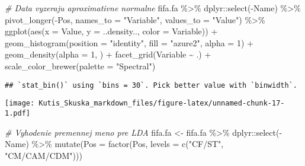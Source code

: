 \documentclass[
]{article}
\newenvironment{Shaded}{\begin{snugshade}}{\end{snugshade}}
\newcommand{\AttributeTok}[1]{\textcolor[rgb]{0.77,0.63,0.00}{#1}}
\newcommand{\CommentTok}[1]{\textcolor[rgb]{0.56,0.35,0.01}{\textit{#1}}}
\newcommand{\DecValTok}[1]{\textcolor[rgb]{0.00,0.00,0.81}{#1}}
\newcommand{\FunctionTok}[1]{\textcolor[rgb]{0.00,0.00,0.00}{#1}}
\newcommand{\NormalTok}[1]{#1}
\newcommand{\OtherTok}[1]{\textcolor[rgb]{0.56,0.35,0.01}{#1}}
\newcommand{\SpecialCharTok}[1]{\textcolor[rgb]{0.00,0.00,0.00}{#1}}
\newcommand{\StringTok}[1]{\textcolor[rgb]{0.31,0.60,0.02}{#1}}
\begin{document}
\begin{Shaded}
\begin{Highlighting}[]
\CommentTok{\# Data vyzeraju aproximativne normalne}
\NormalTok{fifa.fa }\SpecialCharTok{\%\textgreater{}\%}
\NormalTok{    dplyr}\SpecialCharTok{::}\FunctionTok{select}\NormalTok{(}\SpecialCharTok{{-}}\NormalTok{Name) }\SpecialCharTok{\%\textgreater{}\%}
    \FunctionTok{pivot\_longer}\NormalTok{(}\SpecialCharTok{{-}}\NormalTok{Pos, }\AttributeTok{names\_to =} \StringTok{"Variable"}\NormalTok{, }\AttributeTok{values\_to =} \StringTok{"Value"}\NormalTok{) }\SpecialCharTok{\%\textgreater{}\%}
    \FunctionTok{ggplot}\NormalTok{(}\FunctionTok{aes}\NormalTok{(}\AttributeTok{x =}\NormalTok{ Value, }\AttributeTok{y =}\NormalTok{ ..density.., }\AttributeTok{color =}\NormalTok{ Variable)) }\SpecialCharTok{+}
    \FunctionTok{geom\_histogram}\NormalTok{(}\AttributeTok{position =} \StringTok{"identity"}\NormalTok{,}
                   \AttributeTok{fill =} \StringTok{"azure2"}\NormalTok{,}
                   \AttributeTok{alpha =} \DecValTok{1}\NormalTok{) }\SpecialCharTok{+}
    \FunctionTok{geom\_density}\NormalTok{(}\AttributeTok{alpha =} \DecValTok{1}\NormalTok{, ) }\SpecialCharTok{+}
    \FunctionTok{facet\_grid}\NormalTok{(Variable }\SpecialCharTok{\textasciitilde{}}\NormalTok{ .) }\SpecialCharTok{+}
    \FunctionTok{scale\_color\_brewer}\NormalTok{(}\AttributeTok{palette =} \StringTok{"Spectral"}\NormalTok{)}
\end{Highlighting}
\end{Shaded}

\begin{verbatim}
## `stat_bin()` using `bins = 30`. Pick better value with `binwidth`.
\end{verbatim}

\texttt{[image: Kutis\_Skuska\_markdown\_files/figure-latex/unnamed-chunk-17-1.pdf]}

\begin{Shaded}
\begin{Highlighting}[]
\CommentTok{\# Vyhodenie premennej meno pre LDA}
\NormalTok{fifa.fa }\OtherTok{\textless{}{-}}
\NormalTok{    fifa.fa }\SpecialCharTok{\%\textgreater{}\%}\NormalTok{ dplyr}\SpecialCharTok{::}\FunctionTok{select}\NormalTok{(}\SpecialCharTok{{-}}\NormalTok{Name) }\SpecialCharTok{\%\textgreater{}\%} \FunctionTok{mutate}\NormalTok{(}\AttributeTok{Pos =} \FunctionTok{factor}\NormalTok{(Pos, }\AttributeTok{levels =}
                                                                 \FunctionTok{c}\NormalTok{(}\StringTok{"CF/ST"}\NormalTok{, }\StringTok{"CM/CAM/CDM"}\NormalTok{)))}
\end{Highlighting}
\end{Shaded}
\end{document}
